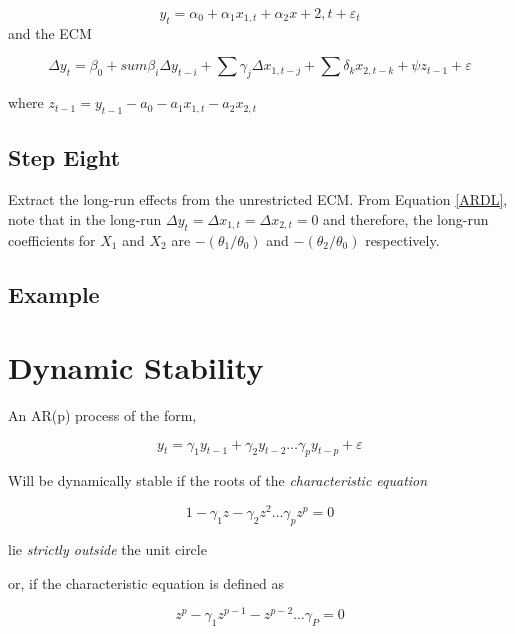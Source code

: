 \documentclass[12pt, a4paper, oneside]{article}\usepackage[]{graphicx}\usepackage[]{color}
\begin{document}
\begin{equation}
y_t = \alpha_0 + \alpha_1 x_{1, t} + \alpha_2 x+{2, t} + \varepsilon_t
\end{equation}
and the ECM

\begin{equation}
\Delta y_t = \beta_0 + sum \beta_i \Delta y_{t-i} + \sum \gamma_j \Delta x_{1, t-j} + \sum \delta_k x_{2, t-k} + \psi z_{t-1} + \varepsilon
\end{equation}

where $z_{t-1} = y_{t-1} - a_0 - a_1 x_{1,t} - a_2 x_{2,t}$

\subsection*{Step Eight}
Extract the long-run effects from the unrestricted ECM.  From Equation \ref{ARDL}, note that in the long-run $\Delta y_t = \Delta x_{1,t} = \Delta x_{2,t} = 0$ and therefore, the long-run coefficients for $X_1$ and $X_2$ are $-(\theta_1/\theta_0)$ and $-(\theta_2/\theta_0)$ respectively. 


\subsection*{Example}





\section{Dynamic Stability}
An AR(p) process of the form, 

\begin{equation}
y_t = \gamma_1 y_{t-1} + \gamma_2 y_{t-2} \dots \gamma_p y_{t-p} + \varepsilon
\end{equation}

Will be dynamically stable if the roots of the \emph{characteristic equation} 

\begin{equation}
1 - \gamma_1 z - \gamma_2 z^2 \dots \gamma_p z^p = 0
\end{equation}

lie \emph{strictly outside} the unit circle

or, if the characteristic equation is defined as 

\begin{equation}
z^p - \gamma_1 z^{p-1} - z^{p-2} \dots \gamma_P = 0
\end{equation}
\end{document}
